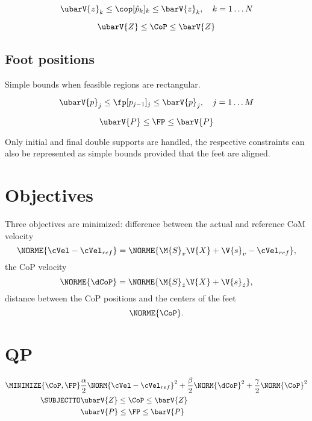 \begin{equation}
    \ubarV{z}_k \le \cop[\hat{p}_k]_k \le \barV{z}_k, \quad k = 1 \dots N\\
\end{equation}

\begin{equation}
    \ubarV{Z} \le \CoP \le \barV{Z}
\end{equation}


\subsection{Foot positions}
Simple bounds when feasible regions are rectangular.

\begin{equation}
    \ubarV{p}_j \le \fp[p_{j-1}]_j \le \barV{p}_j, \quad j = 1 \dots M
\end{equation}

\begin{equation}
    \ubarV{P} \le \FP \le \barV{P}
\end{equation}

Only initial and final double supports are handled, the respective constraints
can also be represented as simple bounds provided that the feet are aligned.


\section{Objectives}
Three objectives are minimized: difference between the actual and reference
\acs{CoM} velocity
%
\begin{equation}
    \NORME{\cVel - \cVel_{ref}} = \NORME{\M{S}_v \V{X} + \V{s}_v - \cVel_{ref}},
\end{equation}
%
the \acs{CoP} velocity
%
\begin{equation}
    \NORME{\dCoP} = \NORME{\M{S}_{\dot{z}} \V{X} + \V{s}_{\dot{z}}},
\end{equation}
%
distance between the \acs{CoP} positions and the centers of the feet
%
\begin{equation}
    \NORME{\CoP}.
\end{equation}
%


\section{QP}
\begin{equation}
\begin{split}
    \MINIMIZE{\CoP, \FP}  & \frac{\alpha}{2} \NORM{\cVel - \cVel_{ref}}^2 +
                              \frac{\beta}{2}  \NORM{\dCoP}^2 +
                              \frac{\gamma}{2} \NORM{\CoP}^2\\
    \SUBJECTTO          & \ubarV{Z} \le \CoP \le \barV{Z} \\
                        & \ubarV{P} \le \FP \le \barV{P}
\end{split}
\end{equation}


